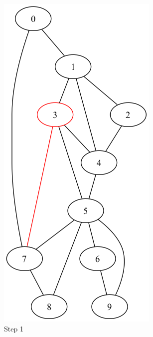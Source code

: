 \documentclass[a4paper,11pt]{report}
\begin{document}
\begin{figure}[htbp]
    \centering
    \begin{subfigure}[b]{0.3\textwidth}
        \includegraphics[height=0.29\textheight]{notebook/assets/aufgabe_07_fleury_step_0.png}
        \caption{Step 1}
        \label{fig:fleury_step_1}
    \end{subfigure}
    \hfill
    \begin{subfigure}[b]{0.3\textwidth}

\end{subfigure}
\end{figure}
\end{document}
